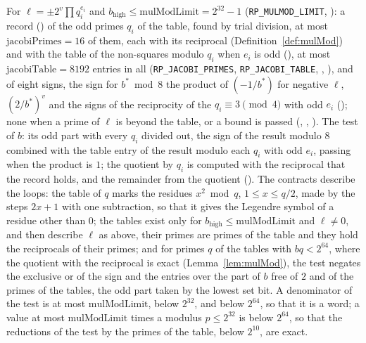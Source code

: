 \begin{definition}\label{def:jacobiTables}
  \leanok
  For $\ell = \pm 2^v \prod q_i^{e_i}$ and $b_{\mathrm{high}} \le \mathrm{mulModLimit} = 2^{32} - 1$
  (\verb|RP_MULMOD_LIMIT|, ): a record
  () of the odd primes $q_i$ of the table, found by trial division,
  at most $\mathrm{jacobiPrimes} = 16$ of them, each with its reciprocal
  (Definition~\ref{def:mulMod}) and with the table of the non-squares modulo $q_i$ when $e_i$ is odd
  (), at most $\mathrm{jacobiTable} = 8192$ entries in all
  (\verb|RP_JACOBI_PRIMES|, \verb|RP_JACOBI_TABLE|, ,
  ), and of eight signs, the sign for $b^* \bmod 8$ the product of
  $(-1 / b^*)$ for negative $\ell$, $(2 / b^*)^v$ and the signs of the reciprocity of the
  $q_i \equiv 3 \pmod 4$ with odd $e_i$ (); none when a prime of
  $\ell$ is beyond the table, or a bound is passed (,
  , ). The test of $b$: its odd
  part with every $q_i$ divided out, the sign of the result modulo $8$ combined with the table entry
  of the result modulo each $q_i$ with odd $e_i$, passing when the product is $1$; the quotient by
  $q_i$ is computed with the reciprocal that the record holds, and the remainder from the quotient
  (). The contracts describe the loops: the table of $q$ marks the
  residues $x^2 \bmod q$, $1 \le x \le q / 2$, made by the steps $2x + 1$ with one subtraction, so
  that it gives the Legendre symbol of a residue other than $0$; the tables exist only for
  $b_{\mathrm{high}} \le \mathrm{mulModLimit}$ and $\ell \ne 0$, and then describe $\ell$ as above,
  their primes are primes of the table and they hold the reciprocals of their primes; and for primes
  $q$ of the tables with $b q < 2^{64}$, where the quotient with the reciprocal is exact
  (Lemma~\ref{lem:mulMod}), the test negates the exclusive or of the sign and the entries over the
  part of $b$ free of $2$ and of the primes of the tables, the odd part taken by the lowest set bit.
  A denominator of the test is at most $\mathrm{mulModLimit}$, below $2^{32}$, and below $2^{64}$,
  so that it is a word; a value at most $\mathrm{mulModLimit}$ times a modulus $p \le 2^{32}$ is
  below $2^{64}$, so that the reductions of the test by the primes of the table, below $2^{10}$, are
  exact.
\end{definition}

